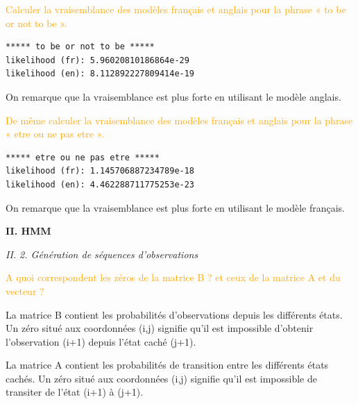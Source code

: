 \documentclass[11pt,a4paper,fleqn]{article}
\begin{document}
\vspace{5mm}
\textcolor{orange}{Calculer la vraisemblance des modèles français et anglais pour la phrase « to be or not to be ».}

\lstset{language=Python}
\lstset{frame=lines}
\lstset{basicstyle=\footnotesize}
\begin{lstlisting}
***** to be or not to be *****
likelihood (fr): 5.96020810186864e-29
likelihood (en): 8.112892227809414e-19
\end{lstlisting}

\vspace{5mm}
On remarque que la vraisemblance est plus forte en utilisant le modèle anglais.

\vspace{5mm}
\textcolor{orange}{De même calculer la vraisemblance des modèles français et anglais pour la phrase « etre ou ne
pas etre ».}

\lstset{language=Python}
\lstset{frame=lines}
\lstset{basicstyle=\footnotesize}
\begin{lstlisting}
***** etre ou ne pas etre *****
likelihood (fr): 1.145706887234789e-18
likelihood (en): 4.462288711775253e-23
\end{lstlisting}

\vspace{5mm}
On remarque que la vraisemblance est plus forte en utilisant le modèle français.

\vspace{5mm}
\textbf{II. HMM}
\vspace{5mm}

\textit{II. 2. Génération de séquences d’observations}

\vspace{5mm}
\textcolor{orange}{A quoi correspondent les zéros de la matrice B ? et ceux de la matrice A et du vecteur ?}

La matrice B contient les probabilités d'observations depuis les différents états. Un zéro situé aux coordonnées (i,j) signifie qu'il est impossible d'obtenir l'observation (i+1) depuis l'état caché (j+1).

La matrice A contient les probabilités de transition entre les différents états cachés. Un zéro situé aux coordonnées (i,j) signifie qu'il est impossible de transiter de l'état (i+1) à (j+1).
\end{document}
